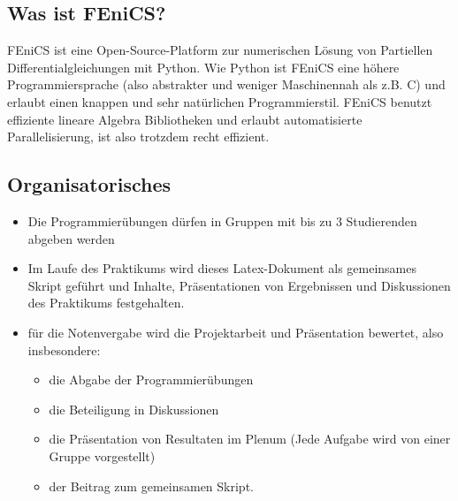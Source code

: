 \documentclass[a4paper, 12pt]{scrartcl}
\begin{document}
\subsection{Was ist FEniCS?}
FEniCS ist eine Open-Source-Platform zur numerischen Lösung von Partiellen Differentialgleichungen mit Python. Wie Python ist FEniCS eine höhere Programmiersprache (also abstrakter und weniger Maschinennah als z.B. C) und erlaubt einen knappen und sehr natürlichen Programmierstil. FEniCS benutzt effiziente lineare Algebra Bibliotheken und erlaubt automatisierte Parallelisierung, ist also trotzdem recht effizient.

\subsection{Organisatorisches}
\begin{itemize}
	\item Die Programmierübungen dürfen in Gruppen mit bis zu 3 Studierenden abgeben werden
	\item Im Laufe des Praktikums wird dieses Latex-Dokument als gemeinsames Skript geführt und Inhalte, Präsentationen von Ergebnissen und Diskussionen des Praktikums festgehalten.
	\item für die Notenvergabe wird die \glqq Projektarbeit und Präsentation\grqq{} bewertet, also insbesondere:
	\begin{itemize}
		\item die Abgabe der Programmierübungen
		\item die Beteiligung in Diskussionen
		\item die Präsentation von Resultaten im Plenum (Jede Aufgabe wird von einer Gruppe vorgestellt)
		\item der Beitrag zum gemeinsamen Skript.
	\end{itemize} 
\end{itemize}
\end{document}
